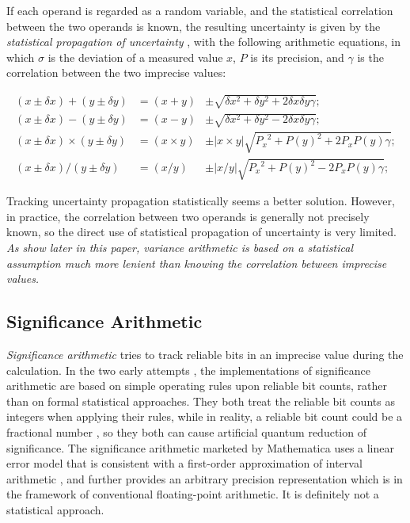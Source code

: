 \documentclass[twoside]{article}
\numberwithin{equation}{section}
\begin{document}
If each operand is regarded as a random variable, and the statistical correlation between the two operands is known, the resulting uncertainty is given by the \emph{statistical propagation of uncertainty} \cite{Statistical_Arithmetic}\cite{Statistical_Analysis}, with the following arithmetic equations, in which $\sigma$ is the deviation of a measured value $x$, $P$ is its precision, and $\gamma$ is the correlation between the two imprecise values:

\begin{align}
\label{eqn: stat +} 
(x \pm \delta x) + (y \pm \delta y) & = (x + y) & \pm \sqrt{\delta x^{2} + \delta y^{2} + 2 \delta x \delta y \gamma}; \\
\label{eqn: stat -} 
(x \pm \delta x) - (y \pm \delta y) & = (x - y) & \pm \sqrt{\delta x^{2} + \delta y^{2} - 2 \delta x \delta y \gamma}; \\
\label{eqn: stat *} 
(x \pm \delta x) \times (y \pm \delta y) & = (x \times y) & \pm |x \times y| \sqrt{{P_x}^2 + {P(y)}^2 + 2 P_x P(y) \gamma}; \\
\label{eqn: stat /} 
(x \pm \delta x) / (y \pm \delta y) & = (x/y) & \pm |x / y| \sqrt{{P_x}^2 + {P(y)}^2 - 2 P_x P(y) \gamma};
\end{align}

Tracking uncertainty propagation statistically seems a better solution.  
However, in practice, the correlation between two operands is generally not precisely known, so the direct use of statistical propagation of uncertainty is very limited.  
\emph{As show later in this paper, variance arithmetic is based on a statistical assumption much more lenient than knowing the correlation between imprecise values.}


\subsection{Significance Arithmetic \cite{Prev_Precision_Arithmetic}}

\emph{Significance arithmetic} \cite{Significance_Arithmetic} tries to track reliable bits in an imprecise value during the calculation.  
In the two early attempts \cite{Digital_Significance_Arithmetic}\cite{Unnormalized_Arithmetic}, the implementations of significance arithmetic are based on simple operating rules upon reliable bit counts, rather than on formal statistical approaches.  
They both treat the reliable bit counts as integers when applying their rules, while in reality, a reliable bit count could be a fractional number \cite{Mathematica_Significance_Arithmetic}, so they both can cause artificial quantum reduction of significance.  
The significance arithmetic marketed by Mathematica \cite{Mathematica_Significance_Arithmetic} uses a linear error model that is consistent with a first-order approximation of interval arithmetic \cite{Precise_Numerical_Methods}\cite{Interval_Analysis_Theory_Applications}\cite{Interval_Arithmetic}, and further provides an arbitrary precision representation which is in the framework of  conventional floating-point arithmetic. 
It is definitely not a statistical approach. 
\end{document}
